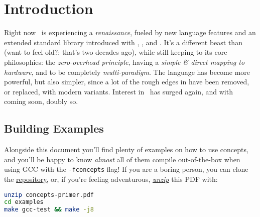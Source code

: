 \section{Introduction} \label{sec:introduction}

Right now \Cpp\ is experiencing a \emph{renaissance}, fueled by new language features and an extended standard library introduced with , , and . It's a different beast than  (want to feel old?: that's two decades ago), while still keeping to its core philosophies: the \emph{zero-overhead principle}, having a \emph{simple \& direct mapping to hardware}, and to be completely \emph{multi-paradigm}. The language has become more powerful, but also simpler, since a lot of the rough edges in  have been removed, or replaced, with modern variants. Interest in \Cpp\ has surged again, and with  coming soon\texttrademark, doubly so.

\subsection*{Building Examples}

Alongside this document you'll find plenty of examples on how to use concepts, and you'll be happy to know \emph{almost} all of them compile out-of-the-box when using GCC with the \texttt{-fconcepts} flag! If you are a boring person, you can clone the \href{https://github.com/CaffeineViking/concepts-primer}{repository}, or, if you're feeling adventurous, \underline{\emph{unzip}} this PDF with:

\begin{lstlisting}[language=bash, morekeywords={unzip, make},
                                  deletekeywords={test}]
unzip concepts-primer.pdf
cd examples
make gcc-test && make -j8
\end{lstlisting}
